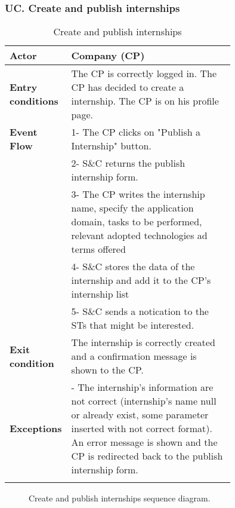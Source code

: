 \subsubsection*{UC\cuc . Create and publish internships}
\begin{center}
    \begin{longtable}{|l|p{0.75\linewidth}|}
        \hline
        \textbf{Actor}            & Company (CP)\\
        \hline
        \textbf{Entry conditions} & The CP is correctly logged in. The CP has decided to create a internship. The CP is on his profile page. \\
        \hline
        \textbf{Event Flow}     & 1- The CP clicks on "Publish a Internship"                                button.\\
                                & 2- S\&C returns the publish internship form.\\
                                & 3- The CP writes the internship name, specify the application domain, tasks to be performed, relevant adopted technologies ad terms offered\\
                                & 4- S\&C stores the data of the internship and add it to the CP's internship list\\
                                & 5- S\&C sends a notication to the STs that might be interested.\\
        \hline
        \textbf{Exit condition}   & The internship is correctly created and a confirmation message is shown to the CP. \\       
        \hline
        \textbf{Exceptions}       & - The internship's information are not                                  correct (internship's name null or already                                exist, some parameter inserted with not correct                           format). An error message is shown and the CP                             is redirected back to the publish internship                              form.\\
        \hline
        \caption{Create and publish internships}
        \label{tab: create_and_publish_internships_usecase}
    \end{longtable}
\end{center}

\begin{figure}[H]
    \begin{center}
        
        \caption{Create and publish internships sequence diagram.}
        \label{fig:create_internship_seqd}%
    \end{center}
\end{figure}

